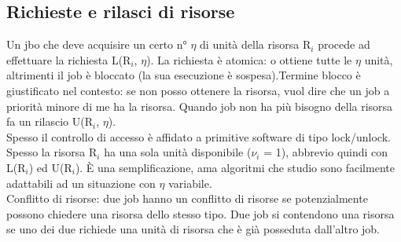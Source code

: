 \documentclass[12pt, oneside]{extbook}
\begin{document}
\subsection{Richieste e rilasci di risorse}
Un jbo che deve acquisire un certo n° $\eta$ di unità della risorsa R$_{i}$ procede ad effettuare la richiesta L(R$_{i}$, $\eta$). La richiesta è atomica: o ottiene tutte  le $\eta$ unità, altrimenti il job è bloccato (la sua esecuzione è sospesa).Termine blocco è giustificato nel contesto: se non posso ottenere la risorsa, vuol dire che un job a priorità minore di me ha la risorsa. Quando job non ha più bisogno della risorsa fa un rilascio U(R$_{i}$, $\eta$).\\ Spesso il controllo di accesso è affidato a primitive software di tipo lock/unlock. Spesso la risorsa R$_{i}$ ha una sola unità disponibile ($\nu_i$ = 1), abbrevio quindi con L(R$_{i}$) ed U(R$_{i}$). È una semplificazione, ama algoritmi che studio sono facilmente adattabili ad un situazione con $\eta$ variabile.\\ Conflitto di risorse: due job hanno un conflitto di risorse se potenzialmente possono chiedere una risorsa dello stesso tipo. Due job si contendono una risorsa se uno dei due richiede una unità di risorsa che è già posseduta dall'altro job.
\end{document}
